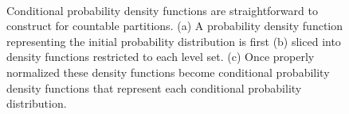 \documentclass[
  letterpaper,
  DIV=11,
  numbers=noendperiod]{scrartcl}
\begin{document}
\begin{figure}
\begin{minipage}{0.45\linewidth}
{}

\subcaption{\label{fig-discrete-conditional-renormalized}}

\end{minipage}%
%
\begin{minipage}{0.28\linewidth}
~\end{minipage}%

\caption{\label{fig-discrete-conditional}Conditional probability density
functions are straightforward to construct for countable partitions. (a)
A probability density function representing the initial probability
distribution is first (b) sliced into density functions restricted to
each level set. (c) Once properly normalized these density functions
become conditional probability density functions that represent each
conditional probability distribution.}

\end{figure}%
\end{document}
